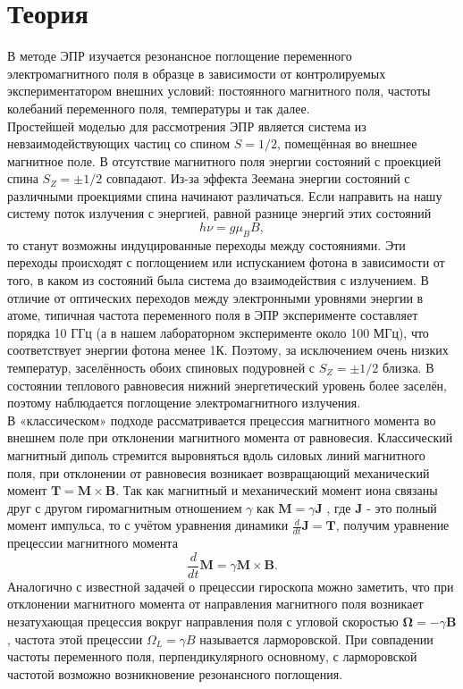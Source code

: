 \documentclass[%
reprint,
amsmath,amssymb,
aps,
]{revtex4-2}
\begin{document}
\section*{Теория}
В методе ЭПР изучается резонансное поглощение переменного электромагнитного поля в образце в зависимости от контролируемых экспериментатором внешних условий: постоянного магнитного поля, частоты колебаний переменного поля, температуры и так далее. \\
Простейшей моделью для рассмотрения ЭПР является система из невзаимодействующих
частиц со спином $S = 1/2$, помещённая во внешнее магнитное поле. В отсутствие
магнитного поля энергии состояний с проекцией спина $S_Z = \pm 1/2$ совпадают. Из-за эффекта Зеемана энергии состояний с различными проекциями спина начинают различаться. Если направить на нашу систему поток излучения с энергией, равной разнице энергий этих состояний
\begin{equation}\label{2}
h \nu = g\mu_B B,
\end{equation}
то станут возможны индуцированные переходы между состояниями. Эти переходы происходят с поглощением или испусканием фотона в зависимости от того, в каком из состояний была система до взаимодействия с излучением. В отличие от оптических переходов между электронными уровнями энергии в атоме, типичная частота переменного поля в ЭПР эксперименте составляет порядка 10 ГГц (а в нашем лабораторном эксперименте около 100 МГц), что соответствует энергии фотона менее 1К. Поэтому, за исключением очень низких температур, заселённость обоих спиновых подуровней с $S_Z = \pm 1/2$ близка. В состоянии теплового равновесия нижний энергетический уровень более заселён, поэтому наблюдается поглощение электромагнитного излучения. \\
В «классическом» подходе рассматривается прецессия магнитного момента во внешнем поле при отклонении магнитного момента от равновесия. Классический магнитный диполь стремится выровняться вдоль силовых линий магнитного поля, при отклонении от равновесия возникает возвращающий механический момент $\mathbf{T} = \mathbf{M}\times \mathbf{B}$. Так как магнитный и механический момент иона связаны друг с другом гиромагнитным отношением $\gamma$ как $\mathbf{M}=\gamma \mathbf{J}$ , где $\mathbf{J}$ - это полный момент импульса, то с учётом уравнения динамики
$\frac{d}{dt}\mathbf{J} = \mathbf{T}$, получим уравнение прецессии магнитного момента
\[\dfrac{d}{dt}\mathbf{M} = \gamma \mathbf{M} \times \mathbf{B}.\]
Аналогично
с известной задачей о прецессии гироскопа можно заметить, что при отклонении магнитного момента от направления магнитного поля возникает незатухающая прецессия вокруг направления поля с угловой скоростью $\boldsymbol{\Omega} = -\gamma \mathbf{B}$, частота этой прецессии $\Omega_L = \gamma B$ называется ларморовской. При совпадении частоты переменного поля, перпендикулярного основному, с ларморовской частотой возможно возникновение резонансного поглощения.
\end{document}
